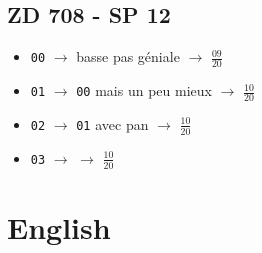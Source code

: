 \documentclass[a4paper, 13pt]{article}
\begin{document}
\vspace{1cm}
\subsection*{ZD 708 - SP 12}
\begin{itemize}
    \item \texttt{00} $\rightarrow$ basse pas géniale $\rightarrow$ \Large{$\frac{09}{20}$} \normalsize \vspace{0.2cm}
    \item \texttt{01} $\rightarrow$ \texttt{00} mais un peu mieux $\rightarrow$ \Large{$\frac{10}{20}$} \normalsize \vspace{0.2cm}
    \item \texttt{02} $\rightarrow$ \texttt{01} avec pan $\rightarrow$ \Large{$\frac{10}{20}$} \normalsize \vspace{0.2cm}
    \item \texttt{03} $\rightarrow$  $\rightarrow$ \Large{$\frac{10}{20}$} \normalsize \vspace{0.2cm}
\end{itemize}


\vspace{1cm}
\section*{English}
\end{document}
